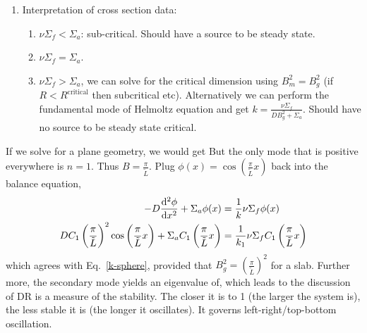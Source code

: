 \documentclass{school-22.211-notes}
\begin{document}
\begin{enumerate}
\item Interpretation of cross section data: 
  \begin{enumerate}
    \item $\nu \Sigma_f < \Sigma_a$: sub-critical. Should have a source to be steady state. 
    \item $\nu \Sigma_f = \Sigma_a$. 
    \item $\nu \Sigma_f > \Sigma_a$, we can solve for the critical dimension using $B_m^2 = B_g^2$ (if $R < R^{\mathrm{critical}}$ then subcritical etc). Alternatively we can perform the fundamental mode of Helmoltz equation and get $\displaystyle k = \frac{\nu \Sigma_f}{DB_g^2 + \Sigma_a}$. 
Should have no source to be steady state critical.  
  \end{enumerate}
\end{enumerate}



\clearpage
{}
If we solve for a plane geometry, we would get
But the only mode that is positive everywhere is $n=1$. Thus $\displaystyle B = \frac{\pi}{\tilde{L}}$. Plug $\phi(x) = \cos \left( \frac{\pi}{\tilde{L}} x \right)$ back into the balance equation, 
\begin{align}
- D \frac{\mathrm{d}^{2}\phi}{\mathrm{d}x^{2}} + \Sigma_a \phi(x) &= \frac{1}{k} \nu \Sigma_f \phi (x) \\
D C_1  \left( \frac{\pi}{\tilde{L}} \right)^2 \cos  \left( \frac{\pi}{\tilde{L}} x \right) + \Sigma_a C_1  \left( \frac{\pi}{\tilde{L}} x \right) &= \frac{1}{k_1} \nu \Sigma_f C_1  \left( \frac{\pi}{\tilde{L}} x \right) 
\end{align}
which agrees with Eq.~\ref{k-sphere}, provided that $B_g^2 = \left( \frac{\pi}{\tilde{L}} \right)^2$ for a slab. Further more, the secondary mode yields an eigenvalue of, 
which leads to the discussion of 
DR is a measure of the stability. The closer it is to 1 (the larger the system is), the less stable it is (the longer it oscillates). It governs left-right/top-bottom oscillation. 
\end{document}
